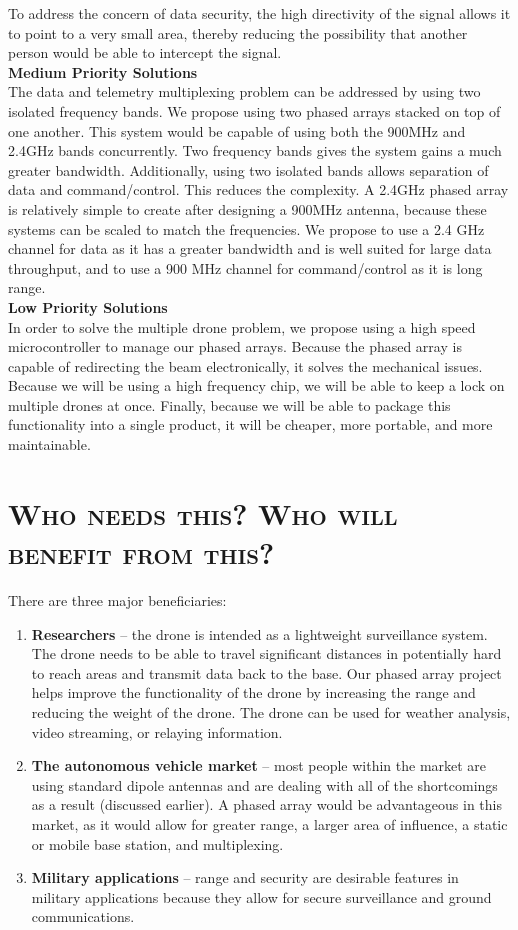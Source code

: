 \documentclass[11pt]{article}
\numberwithin{figure}{section}
\begin{document}
	To address the concern of data security, the high directivity of the signal allows it to point to a very small area, thereby reducing the possibility that another person would be able to intercept the signal.\\
	
	\textbf{Medium Priority Solutions} \\
	The data and telemetry multiplexing problem can be addressed by using two isolated frequency bands.  We propose using two phased arrays stacked on top of one another.  This system would be capable of using both the 900MHz and 2.4GHz bands concurrently.  Two frequency bands gives the system gains a much greater bandwidth.  Additionally, using two isolated bands allows separation of data and command/control.  This reduces the complexity.  A 2.4GHz phased array is relatively simple to create after designing a 900MHz antenna, because these systems can be scaled to match the frequencies.  We propose to use a 2.4 GHz channel for data as it has a greater bandwidth and is well suited for large data throughput, and to use a 900 MHz channel for command/control as it is long range.  \\
	
	\textbf{Low Priority Solutions} \\
	In order to solve the multiple drone problem, we propose using a high speed microcontroller to manage our phased arrays.  Because the phased array is capable of redirecting the beam electronically, it solves the mechanical issues.  Because we will be using a high frequency chip, we will be able to keep a lock on multiple drones at once.  Finally, because we will be able to package this functionality into a single product, it will be cheaper, more portable, and more maintainable.

\section{\textsc{Who needs this? Who will benefit from this?}}
There are three major beneficiaries: 
	\begin{enumerate}
		\item \textbf{Researchers} -- the drone is intended as a lightweight surveillance system.  The drone needs to be able to travel significant distances in potentially hard to reach areas and transmit data back to the base.  Our phased array project helps improve the functionality of the drone by increasing the range and reducing the weight of the drone.  The drone can be used for weather analysis, video streaming, or relaying information.
		\item \textbf{The autonomous vehicle market} -- most people within the market are using standard dipole antennas and are dealing with all of the shortcomings as a result (discussed earlier).  A phased array would be advantageous in this market, as it would allow for greater range, a larger area of influence, a static or mobile base station, and multiplexing.
		\item \textbf{Military applications} -- range and security are desirable features in military applications because they allow for secure surveillance and ground communications.
	\end{enumerate}
\end{document}
